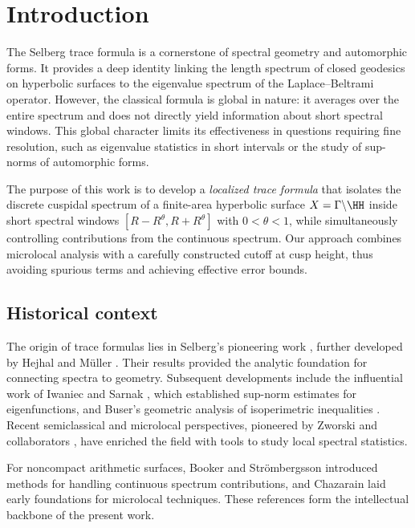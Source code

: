 \section{Introduction}\label{sec:intro}

The Selberg trace formula is a cornerstone of spectral geometry and automorphic forms. 
It provides a deep identity linking the length spectrum of closed geodesics on hyperbolic surfaces 
to the eigenvalue spectrum of the Laplace--Beltrami operator. 
However, the classical formula is global in nature: it averages over the entire spectrum and 
does not directly yield information about short spectral windows. 
This global character limits its effectiveness in questions requiring fine resolution, 
such as eigenvalue statistics in short intervals or the study of sup-norms of automorphic forms. 

The purpose of this work is to develop a \emph{localized trace formula} 
that isolates the discrete cuspidal spectrum of a finite-area hyperbolic surface $X=\Gamma\backslash \HH$ 
inside short spectral windows $[R-R^\theta, R+R^\theta]$ with $0<\theta<1$, 
while simultaneously controlling contributions from the continuous spectrum. 
Our approach combines microlocal analysis with a carefully constructed cutoff at cusp height, 
thus avoiding spurious terms and achieving effective error bounds.

\subsection{Historical context}\label{subsec:history}

The origin of trace formulas lies in Selberg's pioneering work \cite{selberg1956}, 
further developed by Hejhal \cite{hejhal1976, hejhal1983} and Müller \cite{mueller1983}. 
Their results provided the analytic foundation for connecting spectra to geometry. 
Subsequent developments include the influential work of Iwaniec and Sarnak \cite{iwaniec1995}, 
which established sup-norm estimates for eigenfunctions, 
and Buser's geometric analysis of isoperimetric inequalities \cite{buser1992}. 
Recent semiclassical and microlocal perspectives, pioneered by Zworski and collaborators 
\cite{zworski2012, dyatlovzworski2019}, have enriched the field with tools to study local spectral statistics. 

For noncompact arithmetic surfaces, Booker and Strömbergsson \cite{booker2006} 
introduced methods for handling continuous spectrum contributions, 
and Chazarain \cite{chazarain1974} laid early foundations for microlocal techniques. 
These references form the intellectual backbone of the present work.


